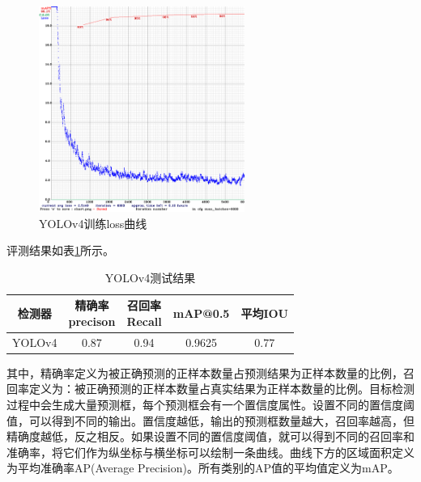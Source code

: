 \begin{figure}[htb] 
    \center
    \includegraphics[width=0.6\textwidth]{figure/fig23.png}
    \caption{YOLOv4训练loss曲线}
    \label{fig23}
\end{figure}

评测结果如表\ref{table8}所示。
\begin{table}[htb]
    \centering
    \caption{YOLOv4测试结果}
    \begin{tabular}{c c c c c}
    \toprule
    检测器 & \makecell{精确率\\precison} & \makecell{召回率\\Recall} & mAP@0.5 & 平均IOU \\
    \midrule 
    YOLOv4 & 0.87 & 0.94 & 0.9625 & 0.77 \\
    \bottomrule
    \end{tabular}
    \label{table8}
\end{table}
其中，精确率定义为被正确预测的正样本数量占预测结果为正样本数量的比例，召回率定义为：被正确预测的正样本数量占真实结果为正样本数量的比例。目标检测过程中会生成大量预测框，每个预测框会有一个置信度属性。设置不同的置信度阈值，可以得到不同的输出。置信度越低，输出的预测框数量越大，召回率越高，但精确度越低，反之相反。如果设置不同的置信度阈值，就可以得到不同的召回率和准确率，将它们作为纵坐标与横坐标可以绘制一条曲线。曲线下方的区域面积定义为平均准确率AP(Average Precision)。所有类别的AP值的平均值定义为mAP。

